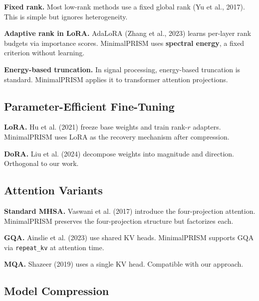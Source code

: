 \textbf{Fixed rank.} Most low-rank methods use a fixed global rank (Yu et al., 
2017). This is simple but ignores heterogeneity.

\textbf{Adaptive rank in LoRA.} AdaLoRA (Zhang et al., 2023) learns per-layer 
rank budgets via importance scores. MinimalPRISM uses \textbf{spectral energy}, a 
fixed criterion without learning.

\textbf{Energy-based truncation.} In signal processing, energy-based truncation 
is standard. MinimalPRISM applies it to transformer attention projections.

\subsection{Parameter-Efficient Fine-Tuning}

\textbf{LoRA.} Hu et al. (2021) freeze base weights and train rank-$r$ adapters. 
MinimalPRISM uses LoRA as the recovery mechanism after compression.

\textbf{DoRA.} Liu et al. (2024) decompose weights into magnitude and direction. 
Orthogonal to our work.

\subsection{Attention Variants}

\textbf{Standard MHSA.} Vaswani et al. (2017) introduce the four-projection 
attention. MinimalPRISM preserves the four-projection structure but 
factorizes each.

\textbf{GQA.} Ainslie et al. (2023) use shared KV heads. MinimalPRISM supports 
GQA via \texttt{repeat\_kv} at attention time.

\textbf{MQA.} Shazeer (2019) uses a single KV head. Compatible with our approach.

\subsection{Model Compression}

